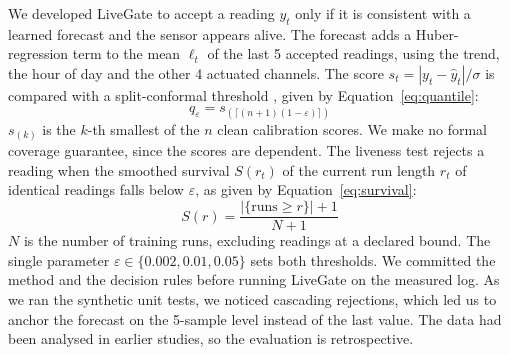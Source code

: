 \documentclass[preprint,12pt,doubleblind]{elsarticle}
\begin{document}
We developed LiveGate to accept a reading $y_t$ only if it is consistent with a learned forecast and the sensor appears alive. The forecast adds a Huber-regression term \cite{huber1964robust} to the mean $\ell_t$ of the last 5 accepted readings, using the trend, the hour of day and the other 4 actuated channels. The score $s_t=|y_t-\hat{y}_t|/\sigma$ is compared with a split-conformal threshold \cite{vovk2005algorithmic,angelopoulos2023gentle}, given by Equation~\ref{eq:quantile}:
\begin{equation}
\label{eq:quantile}
q_\varepsilon = s_{(\lceil (n+1)(1-\varepsilon) \rceil)}
\end{equation}
$s_{(k)}$ is the $k$-th smallest of the $n$ clean calibration scores. We make no formal coverage guarantee, since the scores are dependent. The liveness test rejects a reading when the smoothed survival $S(r_t)$ of the current run length $r_t$ of identical readings falls below $\varepsilon$, as given by Equation~\ref{eq:survival}:
\begin{equation}
\label{eq:survival}
S(r)=\frac{|\{\text{runs}\ge r\}|+1}{N+1}
\end{equation}
$N$ is the number of training runs, excluding readings at a declared bound. The single parameter $\varepsilon\in\{0.002,0.01,0.05\}$ sets both thresholds. We committed the method and the decision rules before running LiveGate on the measured log. As we ran the synthetic unit tests, we noticed cascading rejections, which led us to anchor the forecast on the 5-sample level instead of the last value. The data had been analysed in earlier studies, so the evaluation is retrospective.
\end{document}
